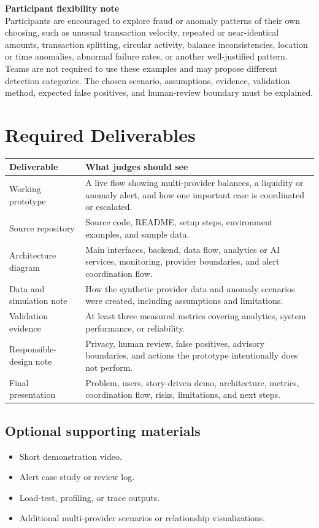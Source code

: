 \documentclass[11pt,a4paper]{article}
\begin{document}
\textbf{Participant flexibility note}\\
Participants are encouraged to explore fraud or anomaly patterns of their own choosing, such as unusual transaction velocity, repeated or near-identical amounts, transaction splitting, circular activity, balance inconsistencies, location or time anomalies, abnormal failure rates, or another well-justified pattern. Teams are not required to use these examples and may propose different detection categories. The chosen scenario, assumptions, evidence, validation method, expected false positives, and human-review boundary must be explained.

\section{Required Deliverables}
\noindent
\begin{tabularx}{\textwidth}{@{} l X @{}}
\toprule
\textbf{Deliverable} & \textbf{What judges should see} \\
\midrule
Working prototype & A live flow showing multi-provider balances, a liquidity or anomaly alert, and how one important case is coordinated or escalated. \\
\addlinespace
Source repository & Source code, README, setup steps, environment examples, and sample data. \\
\addlinespace
Architecture diagram & Main interfaces, backend, data flow, analytics or AI services, monitoring, provider boundaries, and alert coordination flow. \\
\addlinespace
Data and simulation note & How the synthetic provider data and anomaly scenarios were created, including assumptions and limitations. \\
\addlinespace
Validation evidence & At least three measured metrics covering analytics, system performance, or reliability. \\
\addlinespace
Responsible-design note & Privacy, human review, false positives, advisory boundaries, and actions the prototype intentionally does not perform. \\
\addlinespace
Final presentation & Problem, users, story-driven demo, architecture, metrics, coordination flow, risks, limitations, and next steps. \\
\bottomrule
\end{tabularx}

\subsection*{Optional supporting materials}
\begin{itemize}[noitemsep]
    \item Short demonstration video.
    \item Alert case study or review log.
    \item Load-test, profiling, or trace outputs.
    \item Additional multi-provider scenarios or relationship visualizations.
\end{itemize}
\end{document}
